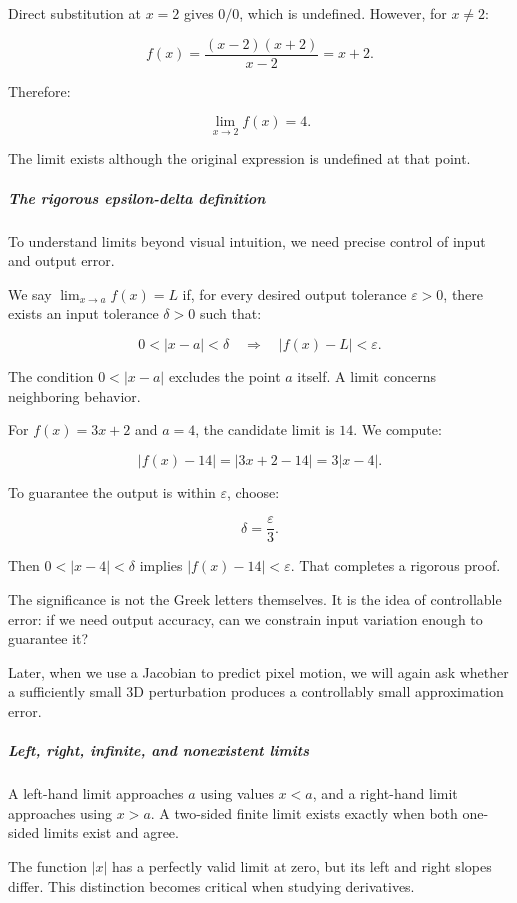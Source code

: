 Direct substitution at \(x=2\) gives \(0/0\), which is undefined. However, for \(x\ne2\):

\[
f(x)=\frac{(x-2)(x+2)}{x-2}=x+2.
\]

Therefore:

\[
\boxed{\lim_{x\to2}f(x)=4}.
\]

The limit exists although the original expression is undefined at that point.

\subparagraph{The rigorous epsilon-delta definition}\label{01-foundations-i-ch020-the-rigorous-epsilon-delta-definition}

To understand limits beyond visual intuition, we need precise control of input and output error.

We say \(\lim_{x\to a}f(x)=L\) if, for every desired output tolerance \(\varepsilon>0\), there exists an input tolerance \(\delta>0\) such that:

\[
0<|x-a|<\delta \quad\Longrightarrow\quad |f(x)-L|<\varepsilon.
\]

The condition \(0<|x-a|\) excludes the point \(a\) itself. A limit concerns neighboring behavior.

For \(f(x)=3x+2\) and \(a=4\), the candidate limit is \(14\). We compute:

\[
|f(x)-14|=|3x+2-14|=3|x-4|.
\]

To guarantee the output is within \(\varepsilon\), choose:

\[
\delta=\frac{\varepsilon}{3}.
\]

Then \(0<|x-4|<\delta\) implies \(|f(x)-14|<\varepsilon\). That completes a rigorous proof.

The significance is not the Greek letters themselves. It is the idea of controllable error: if we need output accuracy, can we constrain input variation enough to guarantee it?

Later, when we use a Jacobian to predict pixel motion, we will again ask whether a sufficiently small 3D perturbation produces a controllably small approximation error.

\subparagraph{Left, right, infinite, and nonexistent limits}\label{01-foundations-i-ch020-left-right-infinite-and-nonexistent-limits}

A left-hand limit approaches \(a\) using values \(x<a\), and a right-hand limit approaches using \(x>a\). A two-sided finite limit exists exactly when both one-sided limits exist and agree.

The function \(|x|\) has a perfectly valid limit at zero, but its left and right slopes differ. This distinction becomes critical when studying derivatives.

